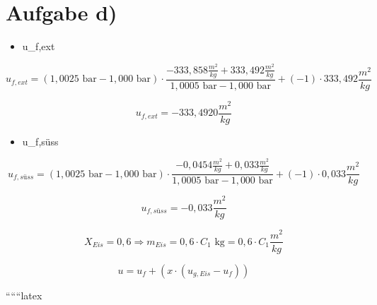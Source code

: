 \section*{Aufgabe d)}


\begin{itemize}
    \item {} u_{f,ext}
\end{itemize}

\[
u_{f,ext} = (1,0025 \text{ bar} - 1,000 \text{ bar}) \cdot \frac{-333,858 \frac{m^2}{kg} + 333,492 \frac{m^2}{kg}}{1,0005 \text{ bar} - 1,000 \text{ bar}} + (-1) \cdot 333,492 \frac{m^2}{kg}
\]

\[
u_{f,ext} = -333,4920 \frac{m^2}{kg}
\]

\begin{itemize}
    \item {} u_{f,süss}
\end{itemize}

\[
u_{f,süss} = (1,0025 \text{ bar} - 1,000 \text{ bar}) \cdot \frac{-0,0454 \frac{m^2}{kg} + 0,033 \frac{m^2}{kg}}{1,0005 \text{ bar} - 1,000 \text{ bar}} + (-1) \cdot 0,033 \frac{m^2}{kg}
\]

\[
u_{f,süss} = -0,033 \frac{m^2}{kg}
\]

\[
X_{Eis} = 0,6 \Rightarrow m_{Eis} = 0,6 \cdot C_{1} \text{ kg} = 0,6 \cdot C_{1} \frac{m^2}{kg}
\]

\[
u = u_f + (x \cdot (u_{g,Eis} - u_f))
\]

``````latex